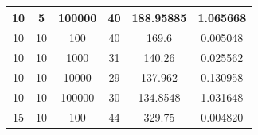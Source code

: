 \documentclass[11pt,a4paper]{report}
\begin{document}
\begin{table}[H]
{\begin{tabular}{c|c|c|c|c|c}
10                                                                                   & 5                                                                                      & 100000                                                                    & 40                                                                                        & 188.95885                                                                 & 1.065668              \\ \hline
10                                                                                   & 10                                                                                     & 100                                                                       & 40                                                                                        & 169.6                                                                     & 0.005048              \\
10                                                                                   & 10                                                                                     & 1000                                                                      & 31                                                                                        & 140.26                                                                    & 0.025562              \\
10                                                                                   & 10                                                                                     & 10000                                                                     & 29                                                                                        & 137.962                                                                   & 0.130958              \\
10                                                                                   & 10                                                                                     & 100000                                                                    & 30                                                                                        & 134.8548                                                                  & 1.031648              \\ \hline
15                                                                                   & 10                                                                                     & 100                                                                       & 44                                                                                        & 329.75                                                                    & 0.004820              \\

\end{tabular}}
\end{table}
\end{document}
